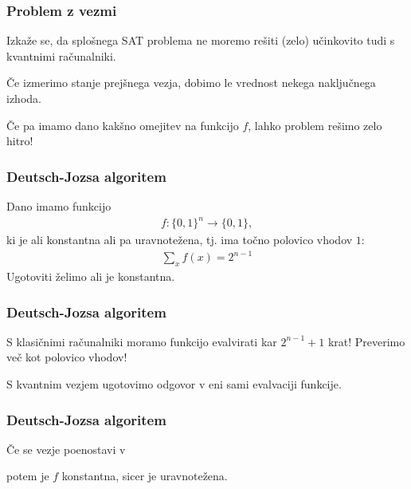 \documentclass[10pt]{beamer}
\begin{document}
\begin{frame}
  \frametitle{Problem z vezmi}
  Izkaže se, da splošnega SAT problema ne moremo rešiti (zelo) učinkovito tudi s kvantnimi računalniki.

  Če izmerimo stanje prejšnega vezja, dobimo le vrednost nekega naključnega izhoda.

  Če pa imamo dano kakšno omejitev na funkcijo \(f\), lahko problem rešimo zelo hitro!
\end{frame}
\begin{frame}
  \frametitle{Deutsch-Jozsa algoritem}
  Dano imamo funkcijo
  \begin{align*}
    f: \{0,1\}^n\to \{0,1\},
  \end{align*}
  ki je ali konstantna ali pa uravnotežena, tj. ima točno polovico vhodov \(1\):
  \begin{align*}
    \sum_x f(x) = 2^{n-1}
  \end{align*}
  Ugotoviti želimo ali je konstantna.
\end{frame}
\begin{frame}
  \frametitle{Deutsch-Jozsa algoritem}
  S klasičnimi računalniki moramo funkcijo evalvirati kar \(2^{n-1}+1\) krat! Preverimo več kot polovico vhodov!

  S kvantnim vezjem ugotovimo odgovor v eni sami evalvaciji funkcije.
  \begin{center}
  \end{center}
\end{frame}
\begin{frame}
  \frametitle{Deutsch-Jozsa algoritem}
  Če se vezje poenostavi v
  \begin{center}
  \end{center}
  potem je \(f\) konstantna, sicer je uravnotežena.
\end{frame}
\end{document}
